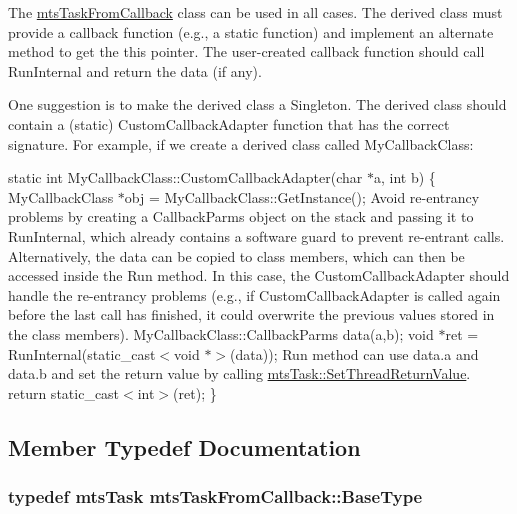 The \hyperlink{classmts_task_from_callback}{mts\+Task\+From\+Callback} class can be used in all cases. The derived class must provide a callback function (e.\+g., a static function) and implement an alternate method to get the \textquotesingle{}this\textquotesingle{} pointer. The user-\/created callback function should call Run\+Internal and return the data (if any).

One suggestion is to make the derived class a Singleton. The derived class should contain a (static) Custom\+Callback\+Adapter function that has the correct signature. For example, if we create a derived class called My\+Callback\+Class\+:

static int My\+Callback\+Class\+::\+Custom\+Callback\+Adapter(char $\ast$a, int b) \{ My\+Callback\+Class $\ast$obj = My\+Callback\+Class\+::\+Get\+Instance(); Avoid re-\/entrancy problems by creating a Callback\+Parms object on the stack and passing it to Run\+Internal, which already contains a software guard to prevent re-\/entrant calls. Alternatively, the data can be copied to class members, which can then be accessed inside the Run method. In this case, the Custom\+Callback\+Adapter should handle the re-\/entrancy problems (e.\+g., if Custom\+Callback\+Adapter is called again before the last call has finished, it could overwrite the previous values stored in the class members). My\+Callback\+Class\+::\+Callback\+Parms data(a,b); void $\ast$ret = Run\+Internal(static\+\_\+cast$<$void $\ast$$>$(data)); Run method can use data.\+a and data.\+b and set the return value by calling \hyperlink{classmts_task_a89f212237d9b7e453c91df8a1a6962d2}{mts\+Task\+::\+Set\+Thread\+Return\+Value}. return static\+\_\+cast$<$int$>$(ret); \} 

\subsection{Member Typedef Documentation}
\hypertarget{classmts_task_from_callback_ab3e56b62478363211e93e97548fcac6f}{}
\subsubsection[{Base\+Type}]{\setlength{\rightskip}{0pt plus 5cm}typedef {\bf mts\+Task} {\bf mts\+Task\+From\+Callback\+::\+Base\+Type}\hspace{0.3cm}{\ttfamily [protected]}}\label{classmts_task_from_callback_ab3e56b62478363211e93e97548fcac6f}


